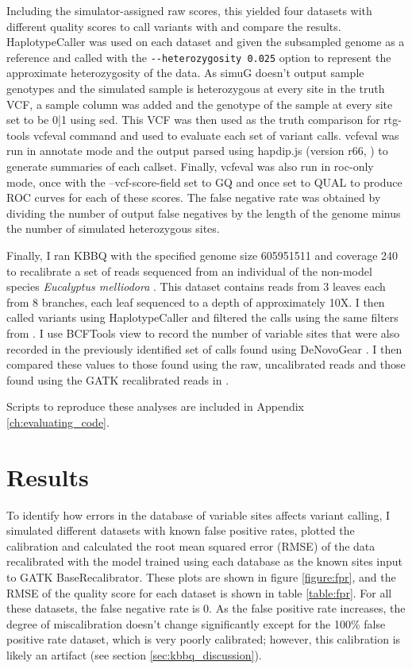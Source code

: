 Including the simulator-assigned raw scores, this yielded four datasets with different quality scores to call variants with and compare the results. HaplotypeCaller was used on each dataset and given the subsampled genome as a reference and called with the \texttt{-\phantom{}-heterozygosity 0.025} option to represent the approximate heterozygosity of the data. As simuG doesn't output sample genotypes and the simulated sample is heterozygous at every site in the truth VCF, a sample column was added and the genotype of the sample at every site set to be 0|1 using sed. This VCF was then used as the truth comparison for rtg-tools vcfeval command and used to evaluate each set of variant calls. vcfeval was run in annotate mode and the output parsed using hapdip.js (version r66, \cite{li_toward_2014}) to generate summaries of each callset. Finally, vcfeval was also run in roc-only mode, once with the --vcf-score-field set to GQ and once set to QUAL to produce ROC curves for each of these scores. The false negative rate was obtained by dividing the number of output false negatives by the length of the genome minus the number of simulated heterozygous sites.

Finally, I ran KBBQ with the specified genome size 605951511 and coverage 240 to recalibrate a set of reads sequenced from an individual of the non-model species \textit{Eucalyptus melliodora} \parencite{orr_phylogenomic_2020}. This dataset contains reads from 3 leaves each from 8 branches, each leaf sequenced to a depth of approximately 10X. I then called variants using HaplotypeCaller and filtered the calls using the same filters from \cite{orr_phylogenomic_2020}. I use BCFTools view to record the number of variable sites that were also recorded in the previously identified set of calls found using DeNovoGear \cite{ramu_denovogear_2013}. I then compared these values to those found using the raw, uncalibrated reads and those found using the GATK recalibrated reads in \cite{orr_phylogenomic_2020}.

Scripts to reproduce these analyses are included in Appendix \ref{ch:evaluating_code}.

\section{Results}
To identify how errors in the database of variable sites affects variant calling, I simulated different datasets with known false positive rates, plotted the calibration and calculated the root mean squared error (RMSE) of the data recalibrated with the model trained using each database as the known sites input to GATK BaseRecalibrator. These plots are shown in figure \ref{figure:fpr}, and the RMSE of the quality score for each dataset is shown in table \ref{table:fpr}. For all these datasets, the false negative rate is 0. As the false positive rate increases, the degree of miscalibration doesn't change significantly except for the 100\% false positive rate dataset, which is very poorly calibrated; however, this calibration is likely an artifact (see section \ref{sec:kbbq_discussion}).

